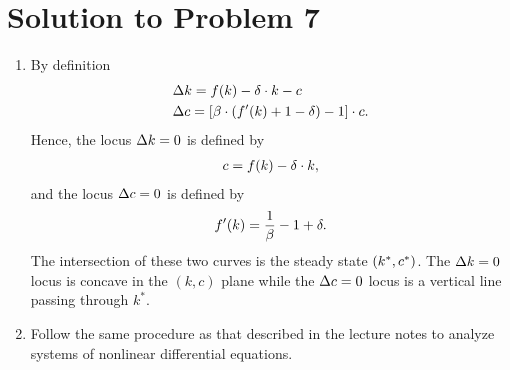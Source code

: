 \documentclass[letterpaper,12pt,leqno]{article}
\begin{document}
\section*{Solution to Problem 7}

\begin{enumerate}
\item By definition
\begin{align*}
\Delta &k=f(k) -\delta\cdot  k-c \\
\Delta &c=\left[ \beta \cdot \left( f'(k) +1-\delta \right) -1 \right]\cdot  c.
\end{align*}
Hence, the locus $\Delta k=0$ is defined by
\begin{align*}
c=f(k) -\delta\cdot  k,
\end{align*}
and the locus $\Delta c=0$ is defined by
\begin{align*}
f'(k) =\frac{1}{\beta}-1+\delta.
\end{align*}
The intersection of these two curves is the steady state $\left( k^*,c^* \right) $. The $\Delta k=0$ locus is concave in the $(k,c)$ plane while the $\Delta c=0$ locus is a vertical line passing through $k^*$.

\item Follow the same procedure as that described in the lecture notes to analyze systems of nonlinear differential equations.
\end{enumerate}
\end{document}
